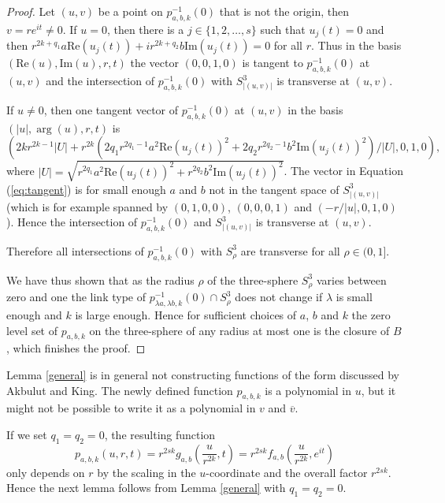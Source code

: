 \documentclass[notitlepage,12pt]{revtex4-1}
\begin{document}
\begin{proof}
Let $(u,v)$ be a point on $p_{a,b,k}^{-1}(0)$ that is not the origin, then $v=re^{it}\neq 0$. If $u=0$, then there is a $j\in\{1,2,\ldots,s\}$ such that $u_{j}(t)=0$ and then $r^{2k+q_{1}}a\mathrm{Re}(u_{j}(t))+ir^{2k+q_{2}}b \mathrm{Im}(u_{j}(t))=0$ for all $r$. Thus in the basis $(\mathrm{Re}(u),\mathrm{Im}(u),r,t)$ the vector $(0,0,1,0)$ is tangent to $p_{a,b,k}^{-1}(0)$ at $(u,v)$ and the intersection of $p_{a,b,k}^{-1}(0)$ with $S^3_{|(u,v)|}$ is transverse at $(u,v)$.

If $u\neq0$, then one tangent vector of $p_{a,b,k}^{-1}(0)$ at $(u,v)$ in the basis $(|u|,\arg(u),r,t)$ is 
\begin{equation}
\label{eq:tangent}
(2kr^{2k-1}|U|+r^{2k}(2q_{1}r^{2q_{1}-1}a^2 \mathrm{Re}(u_{j}(t))^2+2q_{2}r^{2q_{2}-1}b^2 \mathrm{Im}(u_{j}(t))^2)/|U|,0,1,0),
\end{equation}
where $|U|=\sqrt{r^{2q_{1}}a^2 \mathrm{Re}(u_{j}(t))^2+r^{2q_{2}}b^2 \mathrm{Im}(u_{j}(t))^2}$.
The vector in Equation (\ref{eq:tangent}) is for small enough $a$ and $b$ not in the tangent space of $S^{3}_{|(u,v)|}$ (which is for example spanned by $(0,1,0,0)$, $(0,0,0,1)$ and $(-r/|u|,0,1,0)$). Hence the intersection of $p_{a,b,k}^{-1}(0)$ and $S^3_{|(u,v)|}$ is transverse at $(u,v)$.

Therefore all intersections of $p_{a,b,k}^{-1}(0)$ with $S^3_{\rho}$ are transverse for all $\rho\in(0,1]$.

We have thus shown that as the radius $\rho$ of the three-sphere $S^{3}_{\rho}$ varies between zero and one the link type of $p_{\lambda a, \lambda b, k}^{-1}(0)\cap S^{3}_{\rho}$ does not change if $\lambda$ is small enough and $k$ is large enough. Hence for sufficient choices of $a$, $b$ and $k$ the zero level set of $p_{a,b,k}$ on the three-sphere of any radius at most one is the closure of $B$, which finishes the proof.
\end{proof}

Lemma \ref{general} is in general not constructing functions of the form discussed by Akbulut and King. The newly defined function $p_{a,b,k}$ is a polynomial in $u$, but it might not be possible to write it as a polynomial in $v$ and $\overline{v}$. 

If we set $q_{1}=q_{2}=0$, the resulting function
\begin{equation}
\label{eq:p}
p_{a,b,k}(u,r,t)=r^{2sk}g_{a,b}\left(\frac{u}{r^{2k}},t\right)=r^{2sk}f_{a,b}\left(\frac{u}{r^{2k}},e^{it}\right)
\end{equation}
only depends on $r$ by the scaling in the $u$-coordinate and the overall factor $r^{2sk}$. Hence the next lemma follows from Lemma \ref{general} with $q_{1}=q_{2}=0$.
\end{document}
